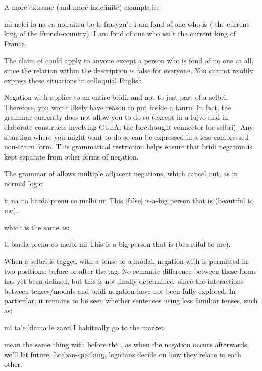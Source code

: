 A more extreme (and more indefinite) example is:
\begin{example}
mi nelci lo na ca nolraitru\n
\T	be le frasygu'e\n
I am-fond-of one-who-is ( the current king\n
\T	of the French-country).\n
I am fond of one who isn't the current king of France.
\end{example}

The claim of  could apply
    to anyone except a person who is fond of no one at all, since
    the relation within the description is false for everyone. You
    cannot readily express these situations in colloquial
    English.

Negation with  applies to an entire bridi, and not to
    just part of a selbri. Therefore, you won't likely have reason
    to put  inside a tanru. In fact, the grammar currently
    does not allow you to do so (except in a lujvo and in elaborate
    constructs involving GUhA, the forethought connector for
    selbri). Any situation where you might want to do so can be
    expressed in a less-compressed non-tanru form. This grammatical
    restriction helps ensure that bridi negation is kept separate
    from other forms of negation.

The grammar of  allows multiple adjacent negations,
    which cancel out, as in normal logic:
\begin{example}
ti na na barda prenu co\n
\T	melbi mi\n
This  [false] is-a-big person\n
\T	that is (beautiful to me).
\end{example}

{\noindent}which is the same as:
\begin{example}
ti barda prenu co melbi mi\n
This is a big-person that is (beautiful to me).
\end{example}

When a selbri is tagged with a tense or a modal, negation
    with  is permitted in two positions: before or after the
    tag. No semantic difference between these forms has yet been
    defined, but this is not finally determined, since the
    interactions between tenses/modals and bridi negation have not
    been fully explored. In particular, it remains to be seen
    whether sentences using less familiar tenses, such as:
\begin{example}
mi  ta'e klama le zarci\n
I habitually go to the market.
\end{example}

{\noindent}mean the same thing with  before the , as when
    the negation occurs afterwards; we'll let future,
    Lojban-speaking, logicians decide on how they relate to each
    other. 

